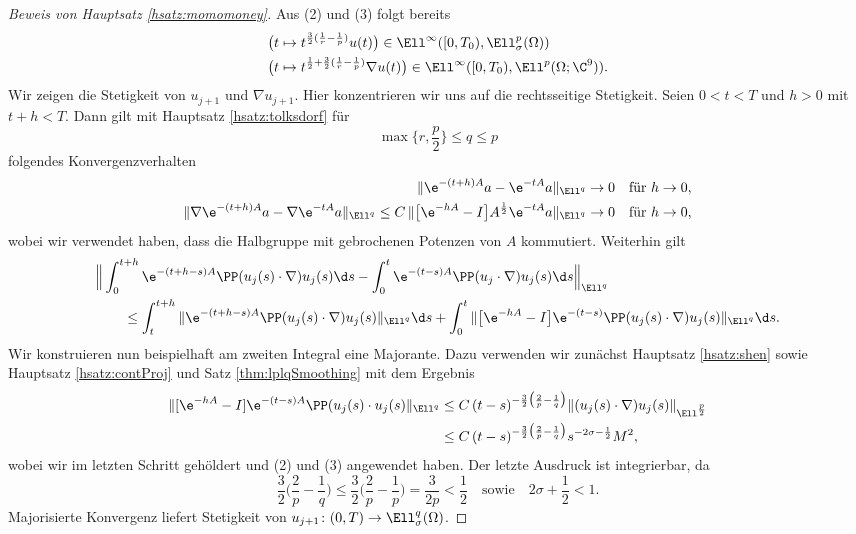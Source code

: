\begin{proof}[Beweis von Hauptsatz \ref{hsatz:momomoney}]
  Aus (2) und (3) folgt bereits
  \begin{align*}
    &\big( t \mapsto t^{\frac{3}{2}(\frac{1}{r} - \frac{1}{p})} u(t) \big) \in \Ell^\infty([0,T_0), \Ell^p_\sigma(\Omega)) \\
    &\big( t \mapsto t^{\frac{1}{2} + \frac{3}{2}(\frac{1}{r} - \frac{1}{p})} \nabla u(t) \big) \in \Ell^\infty([0,T_0), \Ell^p(\Omega; \C^9) ).
  \end{align*}
  Wir zeigen die Stetigkeit von $u_{j + 1}$ und $\nabla u_{j + 1}$.
  Hier konzentrieren wir uns auf die rechtsseitige Stetigkeit.
  Seien $0 < t < T$ und $h > 0$ mit $t + h < T$.
  Dann gilt mit Hauptsatz \ref{hsatz:tolksdorf} für
  $$
  \max\{r, \frac{p}{2} \} \leq q \leq p
  $$
  folgendes Konvergenzverhalten
  \begin{align*}
    \|\e^{-(t + h)A} a - \e^{-t A} a \|_{\Ell^q} \to 0 &\quad\text{für } h \to 0, \\
    \|\nabla\e^{-(t + h)A} a - \nabla \e^{-tA} a \|_{\Ell^q} \leq C\, \| \big[ \e^{-hA} - I \big] A^{\frac{1}{2}} \e^{-tA} a \|_{\Ell^q} \to 0 &\quad\text{für } h \to 0,
  \end{align*}
  wobei wir verwendet haben, dass die Halbgruppe mit gebrochenen Potenzen von $A$ kommutiert.
  Weiterhin gilt
  \begin{align*}
    &\Big\| \int_0^{t + h} \e^{-(t + h - s) A} \PP(u_j(s) \cdot \nabla) u_j(s) \d s - \int_0^t \e^{-(t - s)A} \PP(u_j \cdot \nabla) u_j(s) \d s \Big\|_{\Ell^q} \\
    &\qquad\leq \int_t^{t + h} \|\e^{-(t + h - s)A} \PP(u_j(s) \cdot \nabla) u_j(s) \|_{\Ell^q} \d s + \int_0^t \| \big[ \e^{-hA} - I \big] \e^{-(t - s)} \PP(u_j(s) \cdot \nabla) u_j(s) \|_{\Ell^q} \d s.
  \end{align*}
  Wir konstruieren nun beispielhaft am zweiten Integral eine Majorante.
  Dazu verwenden wir zunächst Hauptsatz \ref{hsatz:shen} sowie Hauptsatz \ref{hsatz:contProj} und Satz \ref{thm:lplqSmoothing} mit dem Ergebnis
  \begin{align*}
    \|[ \e^{-hA} - I] \e^{-(t - s)A} \PP(u_j(s) \cdot u_j(s) \|_{\Ell^q} 
    &\leq C \, (t - s)^{-\frac{3}{2} \big( \frac{2}{p} - \frac{1}{q} \big)} \|(u_j(s) \cdot \nabla) u_j(s) \|_{\Ell^{\frac{p}{2}}} \\
    &\leq C\, (t - s)^{-\frac{3}{2} \big( \frac{2}{p} - \frac{1}{q} \big)} s^{-2\sigma - \frac{1}{2}} M^2,
  \end{align*}
  wobei wir im letzten Schritt gehöldert und (2) und (3) angewendet haben.
  Der letzte Ausdruck ist integrierbar, da
  $$
  \frac{3}{2} \big( \frac{2}{p} - \frac{1}{q} \big)
  \leq \frac{3}{2} \big( \frac{2}{p} - \frac{1}{p} \big)
  = \frac{3}{2p} 
  < \frac{1}{2}
  \quad\text{sowie}\quad 2 \sigma + \frac{1}{2} < 1.
  $$
  Majorisierte Konvergenz liefert Stetigkeit von $u_{j + 1} \colon (0,T) \to \Ell_\sigma^q(\Omega)$.


\end{proof}
